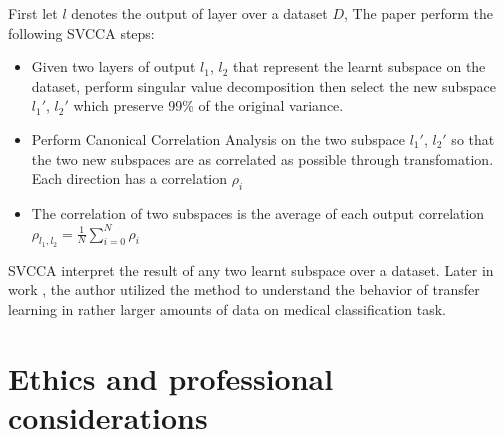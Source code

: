 First let $l$ denotes the output of layer over a dataset $D$, The paper perform the following SVCCA steps:
\begin{itemize}
	\item Given two layers of output $l_{1}$, $l_{2}$ that represent the learnt subspace on the dataset, perform singular value decomposition then select the new subspace $l_{1}'$, $l_{2}'$ which preserve 99\% of the original variance.
	\item Perform Canonical Correlation Analysis on the two subspace $l_{1}'$, $l_{2}'$ so that the two new subspaces are as correlated as possible through transfomation. Each direction has a correlation $\rho_{i}$
	\item The correlation of two subspaces is the average of each output correlation $\rho_{l_{1}, l_{2}} = \frac{1}{N}\sum_{i=0}^{N} \rho_{i}$
\end{itemize}

SVCCA interpret the result of any two learnt subspace over a dataset. Later in work \cite{raghu_transfusion_2019}, the author utilized the method to understand the behavior of transfer learning in rather larger amounts of data on medical classification task.\\

\section{Ethics and professional considerations}
\newpage